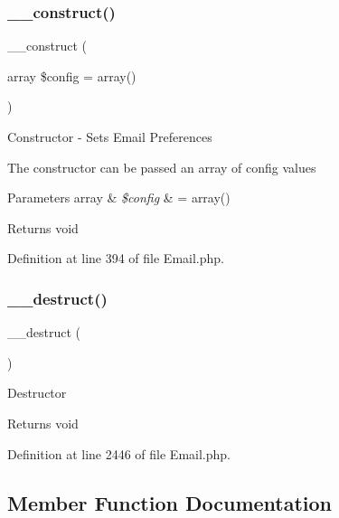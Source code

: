 \subsubsection{\texorpdfstring{\_\_construct()}{\_\_construct()}}
{\footnotesize\ttfamily \+\_\+\+\_\+construct (\begin{DoxyParamCaption}\item[{array}]{\$config = {\ttfamily array()} }\end{DoxyParamCaption})}

Constructor -\/ Sets Email Preferences

The constructor can be passed an array of config values


\begin{DoxyParams}[1]{Parameters}
array & {\em \$config} & = array() \\
\hline
\end{DoxyParams}
\begin{DoxyReturn}{Returns}
void 
\end{DoxyReturn}


Definition at line 394 of file Email.\+php.

\mbox{\label{class_c_i___email_a421831a265621325e1fdd19aace0c758}} 
\subsubsection{\texorpdfstring{\_\_destruct()}{\_\_destruct()}}
{\footnotesize\ttfamily \+\_\+\+\_\+destruct (\begin{DoxyParamCaption}{ }\end{DoxyParamCaption})}

Destructor

\begin{DoxyReturn}{Returns}
void 
\end{DoxyReturn}


Definition at line 2446 of file Email.\+php.



\subsection{Member Function Documentation}
\mbox{\label{class_c_i___email_a24b79594abe7528b9207c3dad7494f70}} 
